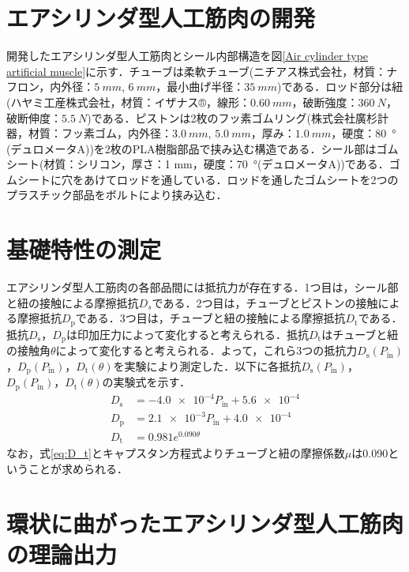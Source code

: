 \section{エアシリンダ型人工筋肉の開発}%
開発したエアシリンダ型人工筋肉とシール内部構造を図\ref{Air cylinder type artificial muscle}に示す．チューブは柔軟チューブ(ニチアス株式会社，材質：ナフロン\textregistered，内外径：$\SI{5}{mm}$, $\SI{6}{mm}$，最小曲げ半径：$\SI{35}{mm}$)である．ロッド部分は紐(ハヤミ工産株式会社，材質：イザナス®，線形：$\SI{0.60}{mm}$，破断強度：$\SI{360}{N}$，破断伸度：$\SI{5.5}{N}$)である．ピストンは2枚のフッ素ゴムリング(株式会社廣杉計器，材質：フッ素ゴム，内外径：$\SI{3.0}{mm}$, $\SI{5.0}{mm}$，厚み：$\SI{1.0}{mm}$，硬度：\SI{80}{\degree}(デュロメータA))を2枚のPLA樹脂部品で挟み込む構造である．シール部はゴムシート(材質：シリコン，厚さ：1 mm，硬度：\SI{70}{\degree}(デュロメータA))である．ゴムシートに穴をあけてロッドを通している．ロッドを通したゴムシートを2つのプラスチック部品をボルトにより挟み込む．

\section{基礎特性の測定}%
エアシリンダ型人工筋肉の各部品間には抵抗力が存在する．1つ目は，シール部と紐の接触による摩擦抵抗$D_s$である．2つ目は，チューブとピストンの接触による摩擦抵抗$D_\mathrm{p}$である．3つ目は，チューブと紐の接触による摩擦抵抗$D_\mathrm{t}$である．抵抗$D_\mathrm{s}$，$D_\mathrm{p}$は印加圧力によって変化すると考えられる．抵抗$D_\mathrm{t}$はチューブと紐の接触角$\theta$によって変化すると考えられる．よって，これら3つの抵抗力$D_\mathrm{s}(P_\mathrm{in})$，$D_\mathrm{p}(P_\mathrm{in})$，$D_\mathrm{t}(\theta)$を実験により測定した．以下に各抵抗$D_\mathrm{s}(P_\mathrm{in})$，$D_\mathrm{p}(P_\mathrm{in})$，$D_\mathrm{t}(\theta)$の実験式を示す．
\begin{align}
  D_\mathrm{s} & = \num{-4.0e-4}P_\mathrm{in} + \num{5.6e-4} \label{eq:D_s} \\
  D_\mathrm{p} & = \num{2.1e-3}P_\mathrm{in} + \num{4.0e-4}  \label{eq:D_p} \\
  D_\mathrm{t} & = 0.981e^{0.090\theta}\label{eq:D_t}
\end{align}
なお，式\ref{eq:D_t}とキャプスタン方程式よりチューブと紐の摩擦係数$\mu$は0.090ということが求められる．
\section{環状に曲がったエアシリンダ型人工筋肉の理論出力}%
